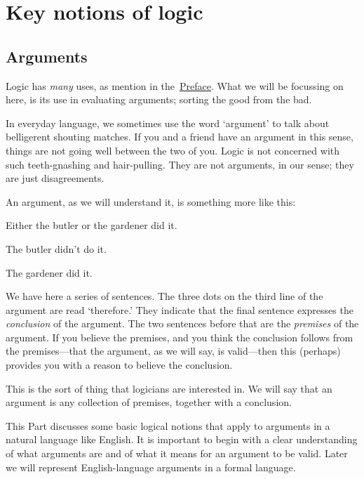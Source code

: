 \part{Key notions of logic}
\label{ch.intro}


\chapter{Arguments}
\label{s:Arguments}

Logic has \emph{many} uses, as mention in the~\hyperref[preface]{Preface}. What we will be focussing on here, is its use in evaluating arguments; sorting the good from the bad.

In everyday language, we sometimes use the word `argument' to talk about belligerent shouting matches.  If you and a friend have an argument in this sense, things are not going well between the two of you. Logic is not concerned with such teeth-gnashing and hair-pulling. They are not arguments, in our sense; they are just disagreements.

An argument, as we will understand it, is something more like this:
	\begin{earg}\label{argButlerGardner}
		\item Either the butler or the gardener did it.
		\item The butler didn't do it.
		\item[\texttherefore] The gardener did it.
	\end{earg}
We have here a series of sentences. The three dots on the third line of the argument are read `therefore.' They indicate that the final sentence expresses the \emph{conclusion} of the argument. The two sentences before that are the \emph{premises} of the argument. If you believe the premises, and you think the conclusion follows from the premises---that the argument, as we will say, is valid---then this (perhaps) provides you with a reason to believe the conclusion.

This is the sort of thing that logicians are interested in. We will say that an argument is any collection of premises, together with a conclusion.

This Part discusses some basic logical notions that apply to arguments in a natural language like English. It is important to begin with a clear understanding of what arguments are and of what it means for an argument to be valid. Later we will represent English-language arguments in a formal language. %

